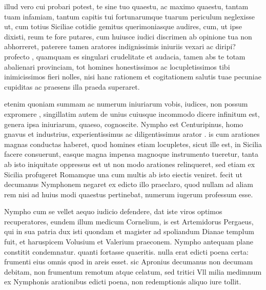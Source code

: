  illud vero cui probari potest, te sine tuo quaestu, ac maximo quaestu, tantam tuam infamiam, tantum capitis tui fortunarumque tuarum periculum neglexisse ut, cum totius Siciliae cotidie gemitus querimoniasque audires, cum, ut ipse dixisti, reum te fore putares, cum huiusce iudici discrimen ab opinione tua non abhorreret, paterere tamen aratores indignissimis iniuriis vexari ac diripi? profecto , quamquam es singulari crudelitate et audacia, tamen abs te totam abalienari provinciam, tot homines honestissimos ac locupletissimos tibi inimicissimos fieri nolles, nisi hanc rationem et cogitationem salutis tuae pecuniae cupiditas ac praesens illa praeda superaret.

 etenim quoniam summam ac numerum iniuriarum vobis, iudices, non possum expromere , singillatim autem de unius cuiusque incommodo dicere infinitum est, genera ipsa iniuriarum, quaeso, cognoscite. Nympho est Centuripinus, homo gnavus et industrius, experientissimus ac diligentissimus arator . is cum arationes magnas conductas haberet, quod homines etiam locupletes, sicut ille est, in Sicilia facere consuerunt, easque magna impensa magnoque instrumento tueretur, tanta ab isto iniquitate oppressus est ut non modo arationes relinqueret, sed etiam ex Sicilia profugeret Romamque una cum multis ab isto eiectis veniret. fecit ut decumanus Nymphonem negaret ex edicto illo praeclaro, quod nullam ad aliam rem nisi ad huius modi quaestus pertinebat, numerum iugerum professum esse.

 Nympho cum se vellet aequo iudicio defendere, dat iste viros optimos recuperatores, eundem illum medicum Cornelium, is est Artemidorus Pergaeus, qui in sua patria dux isti quondam et magister ad spoliandum Dianae templum fuit, et haruspicem Volusium et Valerium praeconem. Nympho antequam plane constitit condemnatur. quanti fortasse quaeritis. nulla erat edicti poena certa: frumenti eius omnis quod in areis esset. sic Apronius decumanus non decumam debitam, non frumentum remotum atque celatum, sed tritici Vll milia medimnum ex Nymphonis arationibus edicti poena, non redemptionis aliquo iure tollit.

